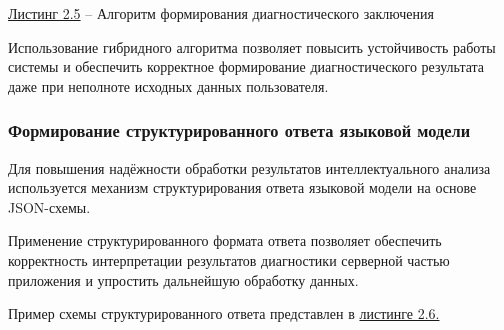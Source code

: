 \documentclass[14pt,a4paper]{extarticle}
\numberwithin{figure}{section}
\numberwithin{table}{section}
\begin{document}
\hyperref[ux43bux438ux44125]{Листинг 2.5} -- Алгоритм формирования
диагностического заключения

Использование гибридного алгоритма позволяет повысить устойчивость
работы системы и обеспечить корректное формирование диагностического
результата даже при неполноте исходных данных пользователя.

\subsubsection{Формирование структурированного ответа языковой модели}

Для повышения надёжности обработки результатов интеллектуального анализа
используется механизм структурирования ответа языковой модели на основе
JSON-схемы.

Применение структурированного формата ответа позволяет обеспечить
корректность интерпретации результатов диагностики серверной частью
приложения и упростить дальнейшую обработку данных.

Пример схемы структурированного ответа представлен в
\protect{}\label{ux43bux438ux44126}{}\hyperref[ux43bux438ux441261]{листинге
2.6.}
\end{document}
